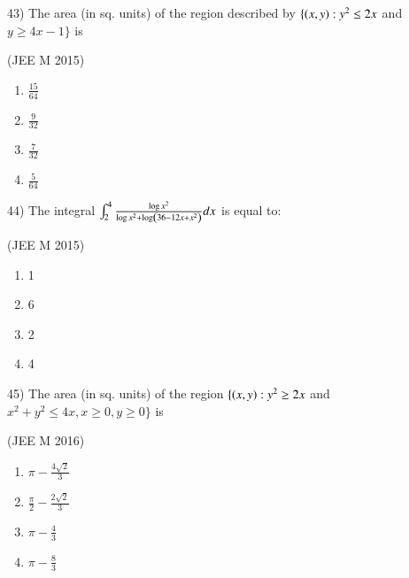 \documentclass[journal,12pt,twocolumn]{IEEEtran}
\theoremstyle{remark}
\begin{document}
43)
	 The area (in sq. units) of the region described by $\{\left(x,y\right):y^2\leq2x$ and $y\geq4x-1\}$ is

		\hfill{(JEE M 2015)}

		\begin{multicols}{4}
			\begin{enumerate}
				\item $\frac{15}{64}$
				\item $\frac{9}{32}$
				\item $\frac{7}{32}$
				\item $\frac{5}{64}$
			\end{enumerate}
		\end{multicols}

44)
	The integral $\int_2^4\frac{\log x^2}{\log x^2 + \log\left(36-12x+x^2\right)}dx$ is equal to:

		\hfill{(JEE M 2015)}

		\begin{multicols}{4}
			\begin{enumerate}
				\item 1
				\item 6
				\item 2
				\item 4
			\end{enumerate}
		\end{multicols}

45)
	 The area (in sq. units) of the region $\{\left(x,y\right):y^2\geq2x$ and $x^2+y^2\leq4x, x\geq0, y\geq0\}$ is

		\hfill{(JEE M 2016)}

		\begin{multicols}{2}
			\begin{enumerate}
				\item $\pi-\frac{4\sqrt{2}}{3}$
				\item $\frac{\pi}{2}-\frac{2\sqrt{2}}{3}$
				\item $\pi-\frac{4}{3}$
				\item $\pi-\frac{8}{3}$ 
			\end{enumerate}
		\end{multicols} 
\end{document}
